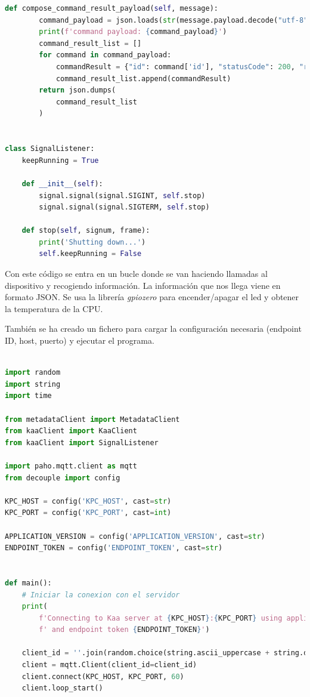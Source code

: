 {\begin{lstlisting}[language=Python]
    def compose_command_result_payload(self, message):
        command_payload = json.loads(str(message.payload.decode("utf-8")))
        print(f'command payload: {command_payload}')
        command_result_list = []
        for command in command_payload:
            commandResult = {"id": command['id'], "statusCode": 200, "reasonPhrase": "OK", "payload": "Success"}
            command_result_list.append(commandResult)
        return json.dumps(
            command_result_list
        )


class SignalListener:
    keepRunning = True

    def __init__(self):
        signal.signal(signal.SIGINT, self.stop)
        signal.signal(signal.SIGTERM, self.stop)

    def stop(self, signum, frame):
        print('Shutting down...')
        self.keepRunning = False

\end{lstlisting}

Con este código se entra en un bucle donde se van haciendo llamadas al dispositivo y recogiendo información. La información que nos llega viene en formato JSON. Se usa la librería \textit{gpiozero} para encender/apagar el led y obtener la temperatura de la CPU. 

También se ha creado un fichero para cargar la configuración necesaria (endpoint ID, host, puerto) y ejecutar el programa.

\begin{lstlisting}[language=Python]

import random
import string
import time

from metadataClient import MetadataClient
from kaaClient import KaaClient
from kaaClient import SignalListener

import paho.mqtt.client as mqtt
from decouple import config

KPC_HOST = config('KPC_HOST', cast=str)
KPC_PORT = config('KPC_PORT', cast=int)

APPLICATION_VERSION = config('APPLICATION_VERSION', cast=str)
ENDPOINT_TOKEN = config('ENDPOINT_TOKEN', cast=str)


def main():
    # Iniciar la conexion con el servidor
    print(
        f'Connecting to Kaa server at {KPC_HOST}:{KPC_PORT} using application version {APPLICATION_VERSION}'
        f' and endpoint token {ENDPOINT_TOKEN}')

    client_id = ''.join(random.choice(string.ascii_uppercase + string.digits) for _ in range(6))
    client = mqtt.Client(client_id=client_id)
    client.connect(KPC_HOST, KPC_PORT, 60)
    client.loop_start()


\end{lstlisting}}
